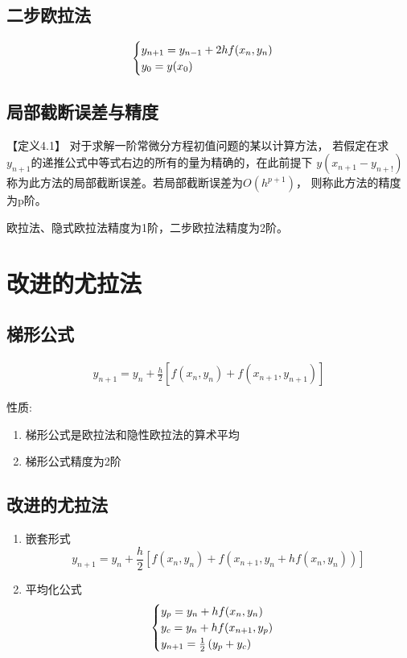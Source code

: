 \documentclass[12pt]{report}
\begin{document}
\subsection{二步欧拉法}
\begin{equation}
	\notag
	\begin{cases}
		y_{n+1} = y_{n-1} + 2hf(x_n , y_n) \\
		y_0 = y(x_0)
	\end{cases}
\end{equation}


\subsection{局部截断误差与精度}

【定义4.1】 \quad 对于求解一阶常微分方程初值问题的某以计算方法，
若假定在求$y_{n+1}$的递推公式中等式右边的所有的量为精确的，在此前提下
$y(x_{n+1}-y_{n+!})$称为此方法的局部截断误差。若局部截断误差为$O(h^{p+1})$，
则称此方法的精度为p阶。

欧拉法、隐式欧拉法精度为1阶，二步欧拉法精度为2阶。


\section{改进的尤拉法}

\subsection{梯形公式}

\begin{equation}
	\begin{aligned}
		y_{n+1} = y_n + \frac{h}{2} \left[f(x_n, y_n) + f(x_{n+1}, y_{n+1})\right]
	\end{aligned}
	\tag{4.3} \label{4.3}
\end{equation}

性质:

\begin{enumerate}
	\item 梯形公式是欧拉法和隐性欧拉法的算术平均
	\item 梯形公式精度为2阶
\end{enumerate}

\subsection{改进的尤拉法}

\begin{enumerate}
	\item 嵌套形式
	\[
		y_{n+1} = y_n +\frac{h}{2} \left[f(x_n , y_n ) + f(x_{n+1}, y_n + hf(x_n , y_n) )\right]
	\]

	\item 平均化公式
	\begin{equation}
		\begin{cases}
			y_p = y_n + hf(x_n , y_n) \\ 
			y_c = y_n + hf(x_{n+1}, y_p) \\
			y_{n+1} = \frac{1}{2} \left(y_p + y_c\right)
		\end{cases}
		\notag
	\end{equation}
\end{enumerate}
\end{document}
